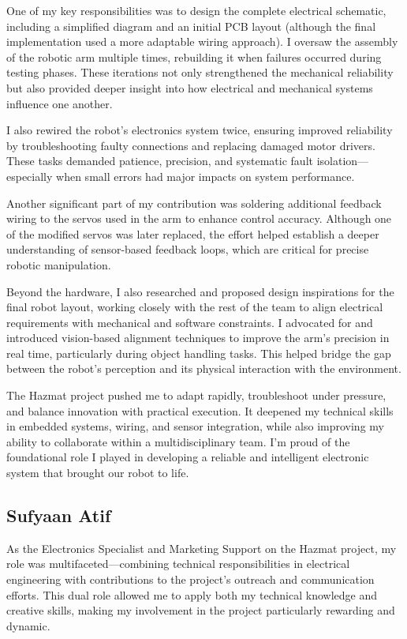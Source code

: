 \documentclass{article}
\begin{document}
\begin{appendices}
One of my key responsibilities was to design the complete electrical schematic, including a simplified diagram and an initial PCB layout (although the final implementation used a more adaptable wiring approach). I oversaw the assembly of the robotic arm multiple times, rebuilding it when failures occurred during testing phases. These iterations not only strengthened the mechanical reliability but also provided deeper insight into how electrical and mechanical systems influence one another.

I also rewired the robot's electronics system twice, ensuring improved reliability by troubleshooting faulty connections and replacing damaged motor drivers. These tasks demanded patience, precision, and systematic fault isolation---especially when small errors had major impacts on system performance.

Another significant part of my contribution was soldering additional feedback wiring to the servos used in the arm to enhance control accuracy. Although one of the modified servos was later replaced, the effort helped establish a deeper understanding of sensor-based feedback loops, which are critical for precise robotic manipulation.

Beyond the hardware, I also researched and proposed design inspirations for the final robot layout, working closely with the rest of the team to align electrical requirements with mechanical and software constraints. I advocated for and introduced vision-based alignment techniques to improve the arm's precision in real time, particularly during object handling tasks. This helped bridge the gap between the robot's perception and its physical interaction with the environment.

The Hazmat project pushed me to adapt rapidly, troubleshoot under pressure, and balance innovation with practical execution. It deepened my technical skills in embedded systems, wiring, and sensor integration, while also improving my ability to collaborate within a multidisciplinary team. I'm proud of the foundational role I played in developing a reliable and intelligent electronic system that brought our robot to life.

\subsection*{Sufyaan Atif}

As the Electronics Specialist and Marketing Support on the Hazmat project, my role was multifaceted---combining technical responsibilities in electrical engineering with contributions to the project's outreach and communication efforts. This dual role allowed me to apply both my technical knowledge and creative skills, making my involvement in the project particularly rewarding and dynamic.


\end{appendices}
\end{document}
